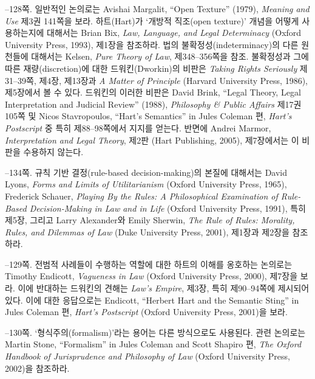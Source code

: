 {--128쪽.  일반적인
논의로는 Avishai Margalit, “Open Texture” (1979), \emph{Meaning and
Use} 제3권 141쪽을 보라. 하트(Hart)가 ‘개방적 직조(open texture)’ 개념을
어떻게 사용하는지에 대해서는 Brian Bix, \emph{Law, Language, and Legal
Determinacy} (Oxford University Press, 1993), 제1장을 참조하라. 법의
불확정성(indeterminacy)의 다른 원천들에 대해서는 Kelsen, \emph{Pure
Theory of Law}, 제348--356쪽을 참조. 불확정성과 그에 따른
재량(discretion)에 대한 드워킨(Dworkin)의 비판은 \emph{Taking Rights
Seriously} 제31--39쪽, 제4장, 제13장과 \emph{A Matter of Principle}
(Harvard University Press, 1986), 제5장에서 볼 수 있다. 드워킨의 이러한
비판은 David Brink, “Legal Theory, Legal Interpretation and Judicial
Review” (1988), \emph{Philosophy \& Public Affairs} 제17권 105쪽 및
Nicos Stavropoulos, “Hart's Semantics” in Jules Coleman 편,
\emph{Hart's Postscript} 중 특히 제88--98쪽에서 지지를 얻는다. 반면에
Andrei Marmor, \emph{Interpretation and Legal Theory}, 제2판 (Hart
Publishing, 2005), 제7장에서는 이 비판을 수용하지 않는다.

--134쪽.  규칙 기반 결정(rule-based decision-making)의 본질에 대해서는
David Lyons, \emph{Forms and Limits of Utilitarianism} (Oxford
University Press, 1965), Frederick Schauer, \emph{Playing By the Rules:
A Philosophical Examination of Rule-Based Decision-Making in Law and in
Life} (Oxford University Press, 1991), 특히 제5장, 그리고 Larry
Alexander와 Emily Sherwin, \emph{The Rule of Rules: Morality, Rules, and
Dilemmas of Law} (Duke University Press, 2001), 제1장과 제2장을
참조하라.

--129쪽.  전범적 사례들이
수행하는 역할에 대한 하트의 이해를 옹호하는 논의로는 Timothy Endicott,
\emph{Vagueness in Law} (Oxford University Press, 2000), 제7장을 보라.
이에 반대하는 드워킨의 견해는 \emph{Law's Empire}, 제3장, 특히
제90--94쪽에 제시되어 있다. 이에 대한 응답으로는 Endicott, “Herbert
Hart and the Semantic Sting” in Jules Coleman 편, \emph{Hart's
Postscript} (Oxford University Press, 2001)을 보라.

--130쪽.  ‘형식주의(formalism)’라는 용어는
다른 방식으로도 사용된다. 관련 논의로는 Martin Stone, “Formalism” in
Jules Coleman and Scott Shapiro 편, \emph{The Oxford Handbook of
Jurisprudence and Philosophy of Law} (Oxford University Press, 2002)을
참조하라.

}
